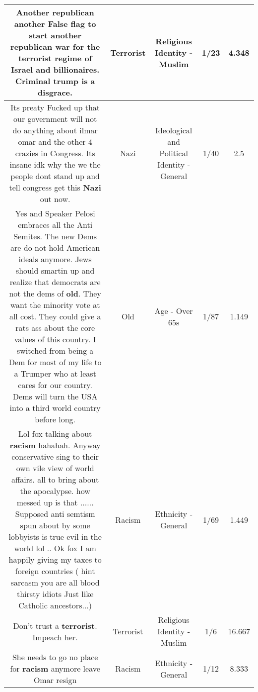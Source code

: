 \documentclass[11pt]{article}
\newlength\mylength
\begin{document}
\begin{center}
\begin{longtable}{|C{.65\mylength}|C{.30\mylength}|C{.12\mylength}|C{.12\mylength}|C{.12\mylength}|}
  \small Another republican another False flag to start another republican war for the \textbf{terrorist} regime of Israel and billionaires. Criminal trump is a disgrace.\normalsize   & Terrorist & Religious Identity - Muslim & 1/23 & 4.348 \\  \hline
  \small Its preaty Fucked up that our government will not do anything about ilmar omar and the other 4 crazies in Congress. Its insane idk why the we the people dont stand up and tell congress get this \textbf{Nazi} out now.\normalsize   & Nazi &  Ideological and Political Identity - General & 1/40 & 2.5 \\  \hline
  \small Yes and Speaker Pelosi embraces all the Anti Semites. The new Dems are do not hold American ideals anymore. Jews should smartin up and realize that democrats are not the dems of \textbf{old}. They want the minority vote at all cost. They could give a rats ass about the core values of this country. I switched from being a Dem for most of my life to a Trumper who at least cares for our country. Dems will turn the USA into a third world country before long.\normalsize   & Old & Age - Over 65s & 1/87 & 1.149 \\  \hline
  \small Lol fox talking about \textbf{racism} hahahah. Anyway conservative sing to their own vile view of world affairs. all to bring about the apocalypse. how messed up is that ...... Supposed anti semtism spun about by some lobbyists is true evil in the world lol .. Ok fox I am happily giving my taxes to foreign countries ( hint sarcasm you are all blood thirsty idiots Just like Catholic ancestors...)\normalsize   & Racism & Ethnicity - General & 1/69 & 1.449 \\  \hline
  \small Don't trust a \textbf{terrorist}.  Impeach her.\normalsize   & Terrorist & Religious Identity - Muslim & 1/6 & 16.667 \\  \hline
  \small She needs to go no place for \textbf{racism} anymore leave Omar resign\normalsize   & Racism & Ethnicity - General & 1/12 & 8.333 \\  \hline

\end{longtable}
\end{center}
\end{document}
